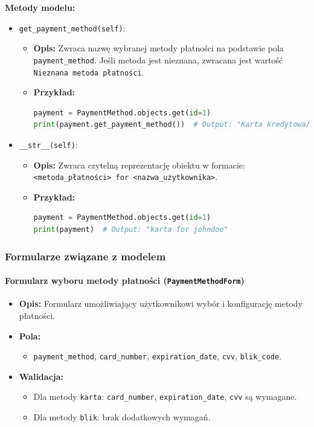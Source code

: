 \documentclass[12pt,a4paper,oneside]{article}
\theoremstyle{definition}
\numberwithin{equation}{section}
\begin{document}
\textbf{Metody modelu:}
\begin{itemize}
    \item \texttt{get\_payment\_method(self)}:
    \begin{itemize}
        \item \textbf{Opis:} Zwraca nazwę wybranej metody płatności na podstawie pola \texttt{payment\_method}. Jeśli metoda jest nieznana, zwracana jest wartość \texttt{Nieznana metoda płatności}.
        \item \textbf{Przykład:}
        \begin{lstlisting}[language=Python]
payment = PaymentMethod.objects.get(id=1)
print(payment.get_payment_method())  # Output: "Karta kredytowa/debetowa"
        \end{lstlisting}
    \end{itemize}
    \item \texttt{\_\_str\_\_(self)}:
    \begin{itemize}
        \item \textbf{Opis:} Zwraca czytelną reprezentację obiektu w formacie: \texttt{<metoda\_płatności> for <nazwa\_użytkownika>}.
        \item \textbf{Przykład:}
        \begin{lstlisting}[language=Python]
payment = PaymentMethod.objects.get(id=1)
print(payment)  # Output: "karta for johndoe"
        \end{lstlisting}
    \end{itemize}
\end{itemize}

\subsubsection*{Formularze związane z modelem}

\paragraph{Formularz wyboru metody płatności (\texttt{PaymentMethodForm})}
\begin{itemize}
    \item \textbf{Opis:} Formularz umożliwiający użytkownikowi wybór i konfigurację metody płatności.
    \item \textbf{Pola:}
    \begin{itemize}
        \item \texttt{payment\_method}, \texttt{card\_number}, \texttt{expiration\_date}, \texttt{cvv}, \texttt{blik\_code}.
    \end{itemize}
    \item \textbf{Walidacja:}
    \begin{itemize}
        \item Dla metody \texttt{karta}: \texttt{card\_number}, \texttt{expiration\_date}, \texttt{cvv} są wymagane.
        \item Dla metody \texttt{blik}: brak dodatkowych wymagań.
    \end{itemize}
\end{itemize}
\end{document}
